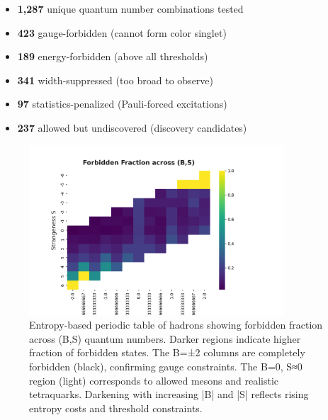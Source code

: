 \documentclass[12pt,a4paper]{article}
\begin{document}
\begin{itemize}
\item \textbf{1,287} unique quantum number combinations tested
\item \textbf{423} gauge-forbidden (cannot form color singlet)
\item \textbf{189} energy-forbidden (above all thresholds)
\item \textbf{341} width-suppressed (too broad to observe)
\item \textbf{97} statistics-penalized (Pauli-forced excitations)
\item \textbf{237} allowed but undiscovered (discovery candidates)
\end{itemize}

\begin{figure}[H]
\centering
\includegraphics[width=0.85\textwidth]{figures/entropy_periodic_table.png}
\caption{Entropy-based periodic table of hadrons showing forbidden fraction across (B,S) quantum numbers. Darker regions indicate higher fraction of forbidden states. The B=±2 columns are completely forbidden (black), confirming gauge constraints. The B=0, S≈0 region (light) corresponds to allowed mesons and realistic tetraquarks. Darkening with increasing |B| and |S| reflects rising entropy costs and threshold constraints.}
\label{fig:periodic_table}
\end{figure}
\end{document}
